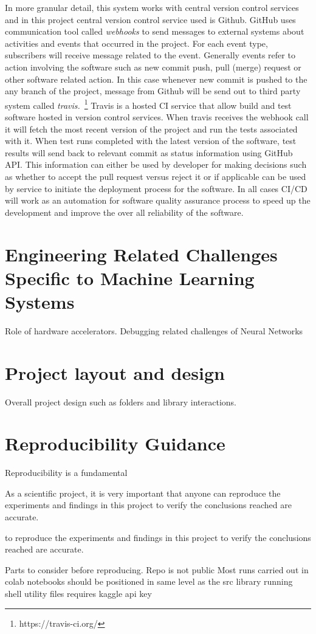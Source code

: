 In more granular detail, this system works with central version control services and in this project central version control service used is Github. GitHub uses communication tool called \emph{webhooks} to send messages to external systems about activities and events that occurred in the project. For each event type, subscribers will receive message related to the event. Generally events refer to action involving the software such as new commit push, pull (merge) request or other software related action. In this case whenever new commit is pushed to the any branch of the project, message from Github will be send out to third party system called \emph{travis.}~\footnote{https://travis-ci.org/} Travis is a hosted CI service that allow build and test software hosted in version control services. When travis receives the webhook call it will fetch the most recent version of the project and run the tests associated with it. When test runs completed with the latest version of the software, test results will send back to relevant commit as status information using GitHub API. This information can either be used by developer for making decisions such as whether to accept the pull request versus reject it or if applicable can be used by service to initiate the deployment process for the software. In all cases CI/CD will work as an automation for software quality assurance process to speed up the development and improve the over all reliability of the software.
 

\section{Engineering Related Challenges Specific to Machine Learning Systems}
Role of hardware accelerators. Debugging related challenges of Neural Networks

\section{Project layout and design}
Overall project design such as folders and library interactions.

\section{Reproducibility Guidance}
Reproducibility is a fundamental 

As a scientific project, it is very important that anyone can reproduce the experiments and findings in this project to verify the conclusions reached are accurate. \cite{dataset}


to reproduce the experiments and findings in this project to verify the conclusions reached are accurate.

Parts to consider before reproducing.
Repo is not public
Most runs carried out in colab 
notebooks should be positioned in same level as the src library
running shell utility files requires kaggle api key


\clearpage